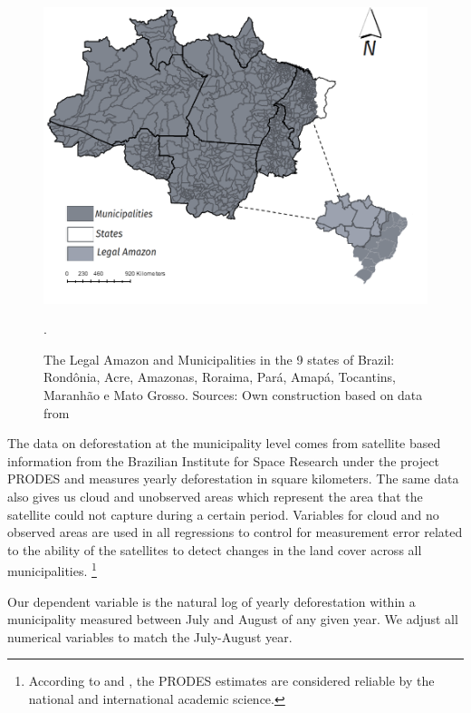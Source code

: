 \begin{figure}[H]
\centering
\includegraphics[width=1\textwidth, inner]{Brazil_insect_map_grey.png}
\caption{The Legal Amazon and Municipalities in the 9 states of Brazil: Rond\^{o}nia, Acre, Amazonas, Roraima, Par\'{a}, Amap\'{a}, Tocantins, Maranh\~{a}o e Mato Grosso. Sources: Own construction based on data from \citep{inpe, IBGE1}}.
\label{fig:1}
\end{figure}

The data on deforestation at the municipality level comes from satellite based information from the Brazilian Institute for Space Research \citep{inpe} under the project PRODES and measures yearly deforestation in square kilometers.  The same data also gives us cloud and unobserved areas which represent the area that the satellite could not capture during a certain period. Variables for cloud and no observed areas are used in all regressions to control for measurement error related to the ability of the satellites to detect changes in the land cover across all municipalities. \footnote{According to \citet{kintisch_2007} and \citet{achard_stibig_eva_lindquist_bouvet_arino_mayaux_2010}, the PRODES estimates are considered reliable by the national and international academic science.}

Our dependent variable is the natural log of yearly deforestation within a municipality measured between July and August of any given year. We adjust all numerical variables to match the July-August year.


